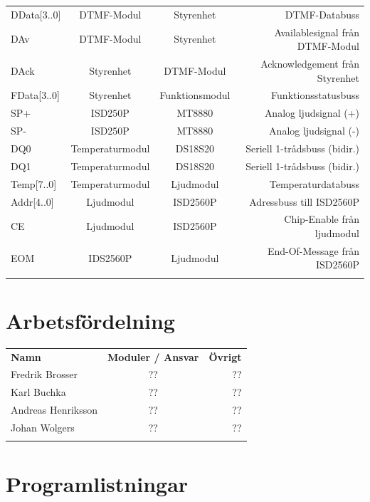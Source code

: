 \documentclass[a4paper,11pt]{article}
\begin{document}
\begin{tabular}{l c c r}
		DData[3..0] & DTMF-Modul & Styrenhet & DTMF-Databuss\\
		DAv & DTMF-Modul & Styrenhet & Availablesignal från DTMF-Modul\\
		DAck & Styrenhet & DTMF-Modul & Acknowledgement från Styrenhet\\

		FData[3..0] & Styrenhet & Funktionsmodul & Funktionsstatusbuss\\

		SP+ & ISD250P & MT8880 & Analog ljudsignal (+)\\
		SP- & ISD250P & MT8880 & Analog ljudsignal (-)\\

		DQ0 & Temperaturmodul & DS18S20 & Seriell 1-trådsbuss (bidir.)\\
		DQ1 & Temperaturmodul & DS18S20 & Seriell 1-trådsbuss (bidir.)\\

		Temp[7..0] & Temperaturmodul & Ljudmodul & Temperaturdatabuss\\

		Addr[4..0] & Ljudmodul & ISD2560P & Adressbuss till ISD2560P\\
		CE & Ljudmodul & ISD2560P & Chip-Enable från ljudmodul\\
		EOM & IDS2560P & Ljudmodul & End-Of-Message från ISD2560P\\\\
	\end{tabular}

	\section{Arbetsfördelning}

	\begin{tabular}{l c r}
		\\{\bf Namn} & {\bf Moduler / Ansvar} & {\bf Övrigt}\\
		Fredrik Brosser 	& ?? 	& ??\\
		Karl Buchka 		& ?? 	& ??\\
		Andreas Henriksson 	& ?? 	& ??\\
		Johan Wolgers 		& ??	& ??\\\\
	\end{tabular}

	\section{Programlistningar}
	\label{sec:programlistningar}	
\end{document}
